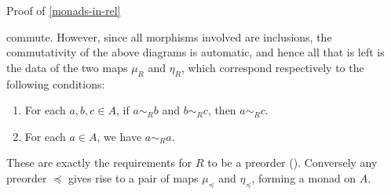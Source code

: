 \begin{Proof}{Proof of \cref{monads-in-rel}}
\begin{webcompile}
%
    \end{webcompile}%
    commute. However, since all morphisms involved are inclusions, the commutativity of the above diagrams is automatic, and hence all that is left is the data of the two maps $\mu_{R}$ and $\eta_{R}$, which correspond respectively to the following conditions:
    \begin{enumerate}%
        \item For each $a,b,c\in A$, if $a\sim_{R}b$ and $b\sim_{R}c$, then $a\sim_{R}c$.
        \item For each $a\in A$, we have $a\sim_{R}a$.
    \end{enumerate}%
    These are exactly the requirements for $R$ to be a preorder (). Conversely any preorder $\preceq$ gives rise to a pair of maps $\mu_{\preceq}$ and $\eta_{\preceq}$, forming a monad on $A$.
\end{Proof}
